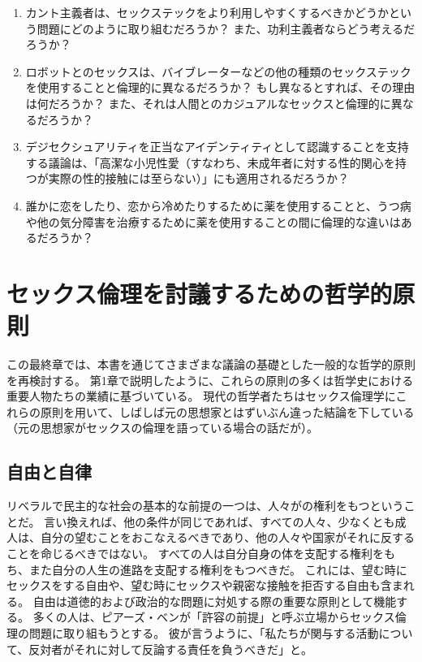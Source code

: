 \documentclass[paper=a4,book,openany]{jlreq}
\begin{document}
\begin{enumerate}
 \item カント主義者は、セックステックをより利用しやすくするべきかどうかという問題にどのように取り組むだろうか？ また、功利主義者ならどう考えるだろうか？
 \item ロボットとのセックスは、バイブレーターなどの他の種類のセックステックを使用することと倫理的に異なるだろうか？ もし異なるとすれば、その理由は何だろうか？ また、それは人間とのカジュアルなセックスと倫理的に異なるだろうか？
 \item デジセクシュアリティを正当なアイデンティティとして認識することを支持する議論は、「高潔な小児性愛（すなわち、未成年者に対する性的関心を持つが実際の性的接触には至らない）」にも適用されるだろうか？
 \item 誰かに恋をしたり、恋から冷めたりするために薬を使用することと、うつ病や他の気分障害を治療するために薬を使用することの間に倫理的な違いはあるだろうか？
\end{enumerate}

\chapter{セックス倫理を討議するための哲学的原則}

この最終章では、本書を通じてさまざまな議論の基礎とした一般的な哲学的原則を再検討する。
第1章で説明したように、これらの原則の多くは哲学史における重要人物たちの業績に基づいている。
現代の哲学者たちはセックス倫理学にこれらの原則を用いて、しばしば元の思想家とはずいぶん違った結論を下している（元の思想家がセックスの倫理を語っている場合の話だが）。

\section{自由と自律}

リベラルで民主的な社会の基本的な前提の一つは、人々がの権利をもつということだ。
言い換えれば、他の条件が同じであれば、すべての人々、少なくとも成人は、自分の望むことをおこなえるべきであり、他の人々や国家がそれに反することを命じるべきではない。
すべての人は自分自身の体を支配する権利をもち、また自分の人生の進路を支配する権利をもつべきだ。
これには、望む時にセックスをする自由や、望む時にセックスや親密な接触を拒否する自由も含まれる。
自由は道徳的および政治的な問題に対処する際の重要な原則として機能する。
多くの人は、ピアーズ・ベンが「許容の前提」と呼ぶ立場からセックス倫理の問題に取り組もうとする。
彼が言うように、「私たちが関与する活動について、反対者がそれに対して反論する責任を負うべきだ」と\citep[p.237]{benn99:_is_sex_moral_special}。
\end{document}
